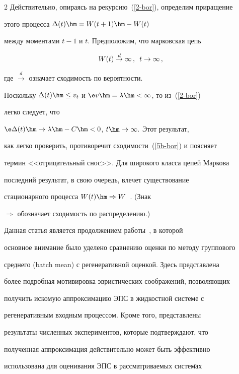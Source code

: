 \begin{multicols}{2}
Действительно, опираясь на рекурсию~(\ref{2-bor}), определим приращение

этого процесса $ \Delta(t)\hm=W(t+1)\hm-W(t)$

 между моментами  $t-1$ и $t$. Предположим, что марковская цепь

\begin{equation}

W(t)\stackrel{d}{\to} \infty\,,\enskip t\to   

\infty\,,

\label{5b-bor}

\end{equation} 

где $\stackrel{d}{\to}$  означает сходимость по вероятности.

 Поскольку $\Delta(t)\hm\le  v_t$ и $\e v\hm=\lambda\hm<\infty$, то  из~(\ref{2-bor}) 

 легко следует, что

$ \e \Delta (t)\hm\to \lambda\hm-C\hm<0$, $t\hm\to \infty. $ Этот результат,

как легко проверить, противоречит сходимости~(\ref{5b-bor}) и  поясняет

термин <<отрицательный снос>>. Для широкого класса цепей Маркова

последний результат, в свою очередь, влечет существование

стационарного процесса $W(t)\hm\Rightarrow W$~\cite{Asmus}. (Знак

$\Rightarrow $ обозначает сходимость по распределению.)



Данная статья является  продолжением работы~\cite{KRC}, в которой

основное внимание было уделено сравнению оценки по методу группового

среднего (batch mean) с регенеративной оценкой. Здесь представ\-ле\-на

более подробная мотивировка эвристических соображений, позволяющих

получить искомую аппроксимацию ЭПС   в жидкостной сис\-те\-ме  с

регенеративным входным процессом. Кроме того, представлены

результаты  численных экспериментов, которые подтверждают, что

полученная аппроксимация действительно может быть эффективно

использована для оценивания ЭПС в рассматриваемых сис\-те\=мах


\end{multicols}
